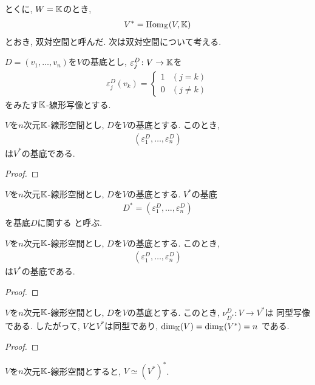 とくに,
$W=\mathbb{K}$のとき,
\begin{align*}
V^{\ast}=\operatorname{Hom}_{\mathbb{K}}(V,\mathbb{K})
\end{align*}
とおき, 双対空間と呼んだ.
次は双対空間について考える.

$D=(v_1,\ldots,v_n)$を$V$の基底とし,
$\varepsilon^{D}_j\colon V\to \mathbb{K}$を
\begin{align*}
\varepsilon^{D}_j (v_k)
=
\begin{cases}
1 & (j=k)\\
0 & (j\neq k)
\end{cases}
\end{align*}
をみたす$\mathbb{K}$-線形写像とする.

\begin{prop}
$V$を$n$次元$\mathbb{K}$-線形空間とし,
$D$を$V$の基底とする.
このとき,
\begin{align*}
(\varepsilon^{D}_1,\ldots,\varepsilon^{D}_n)
\end{align*}
は$V^\ast$の基底である.
\end{prop}
\begin{proof}\end{proof}
\begin{definition}
$V$を$n$次元$\mathbb{K}$-線形空間とし,
$D$を$V$の基底とする.
$V^\ast$の基底
\begin{align*}
D^\ast=(\varepsilon^{D}_1,\ldots,\varepsilon^{D}_n)
\end{align*}
を基底$D$に関する
と呼ぶ.
\end{definition}


\begin{prop}
$V$を$n$次元$\mathbb{K}$-線形空間とし,
$D$を$V$の基底とする.
このとき,
\begin{align*}
(\varepsilon^{D}_1,\ldots,\varepsilon^{D}_n)
\end{align*}
は$V^\ast$の基底である.
\end{prop}
\begin{proof}\end{proof}
\begin{prop}
$V$を$n$次元$\mathbb{K}$-線形空間とし,
$D$を$V$の基底とする.
このとき,
$\nu^{D}_{D^\ast}\colon V\to V^\ast$は
同型写像である.
したがって, $V$と$V^\ast$は同型であり, $\dim_{\mathbb{K}}(V)=\dim_{\mathbb{K}}(V^\ast)=n$
である.
\end{prop}
\begin{proof}\end{proof}

\begin{cor}
$V$を$n$次元$\mathbb{K}$-線形空間とすると,
$V\simeq (V^\ast)^\ast$.
\end{cor}


